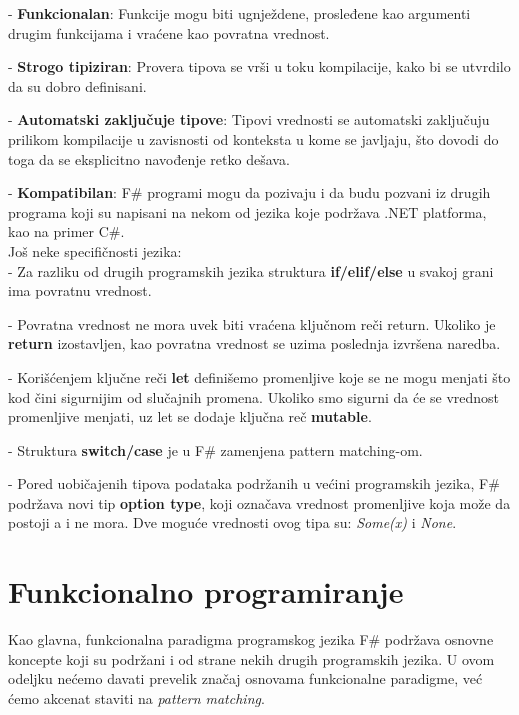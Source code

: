 \documentclass[a4paper]{article}
\begin{document}
	- \textbf{Funkcionalan}: Funkcije mogu biti ugnježdene, prosleđene kao argumenti drugim funkcijama i vraćene kao povratna vrednost.

	- \textbf{Strogo tipiziran}: Provera tipova se vrši u toku kompilacije, kako bi se utvrdilo da su dobro definisani. 

	- \textbf{Automatski zaključuje tipove}: Tipovi vrednosti se automatski zaključuju prilikom kompilacije u zavisnosti od konteksta u kome se javljaju, što dovodi do toga da se eksplicitno navođenje retko dešava.

	- \textbf{Kompatibilan}: F\# programi mogu da pozivaju i da budu pozvani iz drugih programa koji su napisani na nekom od jezika koje podržava .NET platforma, kao na primer C\#\cite{microsoft_c}. 
\\
 
	Još neke specifičnosti jezika: \\
	
	- Za razliku od drugih programskih jezika struktura \textbf{if/elif/else} u svakoj grani ima povratnu vrednost.
	 
	- Povratna vrednost ne mora uvek biti vraćena ključnom reči return. Ukoliko je \textbf{return} izostavljen, kao povratna vrednost se uzima poslednja izvršena naredba.
	 
	- Korišćenjem ključne reči \textbf{let} definišemo promenljive koje se ne mogu menjati što kod čini sigurnijim od slučajnih promena. Ukoliko smo sigurni da će se vrednost promenljive menjati, uz let se dodaje ključna reč \textbf{mutable}.
	 
	- Struktura \textbf{switch/case} je u F\# zamenjena pattern matching-om\cite{expertFS}.
	 
	- Pored uobičajenih tipova podataka podržanih u većini programskih jezika, F\# podržava novi tip \textbf{option type}, koji označava vrednost promenljive koja može da postoji a i ne mora. Dve moguće vrednosti ovog tipa su: {\em Some(x)} i {\em None}.

\section{Funkcionalno programiranje}


Kao glavna, funkcionalna paradigma programskog jezika F\# podržava osnovne koncepte koji su podržani i od strane nekih drugih programskih jezika. U ovom odeljku nećemo davati prevelik značaj osnovama funkcionalne paradigme, već ćemo akcenat staviti na {\em pattern matching}\cite{expertFS}.
\end{document}
